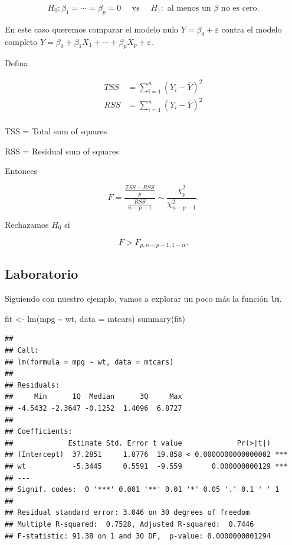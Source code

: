\documentclass[
  12pt,
]{book}
\newenvironment{Shaded}{\begin{snugshade}}{\end{snugshade}}
\newcommand{\AttributeTok}[1]{\textcolor[rgb]{0.77,0.63,0.00}{#1}}
\newcommand{\FunctionTok}[1]{\textcolor[rgb]{0.00,0.00,0.00}{#1}}
\newcommand{\NormalTok}[1]{#1}
\newcommand{\OtherTok}[1]{\textcolor[rgb]{0.56,0.35,0.01}{#1}}
\newcommand{\SpecialCharTok}[1]{\textcolor[rgb]{0.00,0.00,0.00}{#1}}
\theoremstyle{definition}
\theoremstyle{definition}
\theoremstyle{definition}
\theoremstyle{remark}
\begin{document}
\begin{equation*}
 H_{0}: \beta_{1} = \cdots =\beta_{p} = 0 \quad 
 \text{  vs   }\quad H_{1}: \text{ al menos un \(\beta\) no es cero}.
 \end{equation*}

En este caso queremos comparar el modelo nulo \(Y=\beta_{0}+\varepsilon\) contra el modelo completo \(Y=\beta_{0}+ \beta_{1}X_{1} + \cdots + \beta_{p}X_{p} + \varepsilon\).

Defina

\begin{align*}
 TSS &= \sum_{i=1}^{n} \left( Y_{i} -\overline{Y} \right)^{2} \\
 RSS &= \sum_{i=1}^{n} \left( Y_{i} -\overline{Y} \right)^{2} \\
 \end{align*}

TSS = Total sum of squares

RSS = Residual sum of squares

Entonces

\begin{equation*}
 F = \frac{\frac{TSS-RSS}{p}}{\frac{RSS}{n-p-1}} \sim \frac{\chi^{2}_{p}}{\chi^{2}_{n-p-1}}.
 \end{equation*}

Rechazamos \(H_{0}\) si

\begin{equation*}
 F > F_{p, n-p-1, 1-\alpha}.
 \end{equation*}

\hypertarget{laboratorio-2}{%
\subsection{Laboratorio}\label{laboratorio-2}}

Siguiendo con nuestro ejemplo, vamos a explorar un poco más la función \texttt{lm}.

\begin{Shaded}
\begin{Highlighting}[]
\NormalTok{fit }\OtherTok{\textless{}{-}} \FunctionTok{lm}\NormalTok{(mpg }\SpecialCharTok{\textasciitilde{}}\NormalTok{ wt, }\AttributeTok{data =}\NormalTok{ mtcars)}
\FunctionTok{summary}\NormalTok{(fit)}
\end{Highlighting}
\end{Shaded}

\begin{verbatim}
## 
## Call:
## lm(formula = mpg ~ wt, data = mtcars)
## 
## Residuals:
##     Min      1Q  Median      3Q     Max 
## -4.5432 -2.3647 -0.1252  1.4096  6.8727 
## 
## Coefficients:
##             Estimate Std. Error t value             Pr(>|t|)    
## (Intercept)  37.2851     1.8776  19.858 < 0.0000000000000002 ***
## wt           -5.3445     0.5591  -9.559       0.000000000129 ***
## ---
## Signif. codes:  0 '***' 0.001 '**' 0.01 '*' 0.05 '.' 0.1 ' ' 1
## 
## Residual standard error: 3.046 on 30 degrees of freedom
## Multiple R-squared:  0.7528, Adjusted R-squared:  0.7446 
## F-statistic: 91.38 on 1 and 30 DF,  p-value: 0.0000000001294
\end{verbatim}
\end{document}
